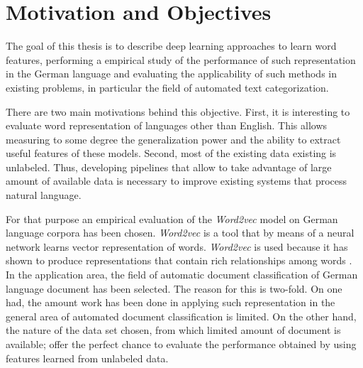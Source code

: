 \section{Motivation and Objectives}

\label{sec:motivation}

The goal of this thesis is to describe deep learning approaches to learn word features,  performing a empirical study of the performance of such representation in the German language and evaluating the applicability of such methods in existing problems, in particular the field of automated text categorization. 

There are two  main motivations behind this objective. First, it is
interesting to evaluate word representation of languages other than English.
This allows measuring  to some degree the generalization power and the ability to extract useful features of these models. Second,  most of the existing data existing is unlabeled. Thus, developing pipelines that allow to take advantage of large amount of available data  is necessary to improve existing systems that  process natural language.  

For that purpose an empirical evaluation of the \textit{Word2vec} model  on German
language corpora has been chosen. \textit{Word2vec} is a tool that by means of
a neural network learns vector representation of words.
\textit{Word2vec} is used  because it has shown to produce representations
that contain rich relationships among words . In the application area, the
field of automatic document classification of German language document has
been selected. The reason for this is two-fold. On one had, the amount  work
has been done in applying such representation  in the general area of
automated document classification is limited. On the other hand, the nature
of the data set chosen,  from which limited amount of document is available;
offer the perfect chance to evaluate the performance obtained by using
features learned from unlabeled data.




